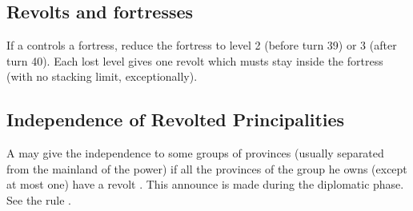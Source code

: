 

\subsection{Revolts and fortresses}
If a \REVOLT controls a fortress, reduce the fortress to level 2 (before turn
39) or 3 (after turn 40). Each lost level gives one revolt \LD which musts
stay inside the fortress (with no stacking limit, exceptionally).

\subsection{Independence of Revolted Principalities}\label{chRedep:Peace:Independence Revolt}
A \MAJ may give the independence to some groups of provinces (usually
separated from the mainland of the power) if all the provinces of the group he
owns (except at most one) have a revolt \Facemoins.  This announce is made
during the diplomatic phase.  See the rule
.


